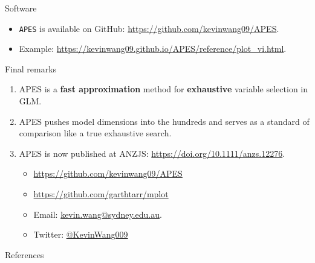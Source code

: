 \documentclass[12pt,aspectratio=169]{beamer}
\begin{document}
\begin{frame}{Software}
\begin{itemize}
\item \texttt{APES} is available on GitHub: \url{https://github.com/kevinwang09/APES}.
\item Example: \url{https://kevinwang09.github.io/APES/reference/plot_vi.html}. 
\end{itemize}
\end{frame}


\begin{frame}{Final remarks}
\begin{enumerate}
	\item APES is a \textbf{fast approximation} method for \textbf{exhaustive} variable selection in GLM. 
	\item APES pushes model dimensions into the hundreds and serves as a standard of comparison like a true exhaustive search. 
	\item APES is now published at ANZJS: \url{https://doi.org/10.1111/anzs.12276}. 
	\begin{itemize}
		\item \href{https://github.com/kevinwang09/APES}{https://github.com/kevinwang09/APES}
		\item \href{https://github.com/garthtarr/mplot}{https://github.com/garthtarr/mplot}
		\item Email: \href{mailto:kevin.wang@sydney.edu.au}{kevin.wang@sydney.edu.au}. 
		\item Twitter: \href{https://twitter.com/KevinWang009}{@KevinWang009}
	\end{itemize}
\end{enumerate}
\end{frame}



\begin{frame}{References}

\scriptsize

\end{frame}
\end{document}
